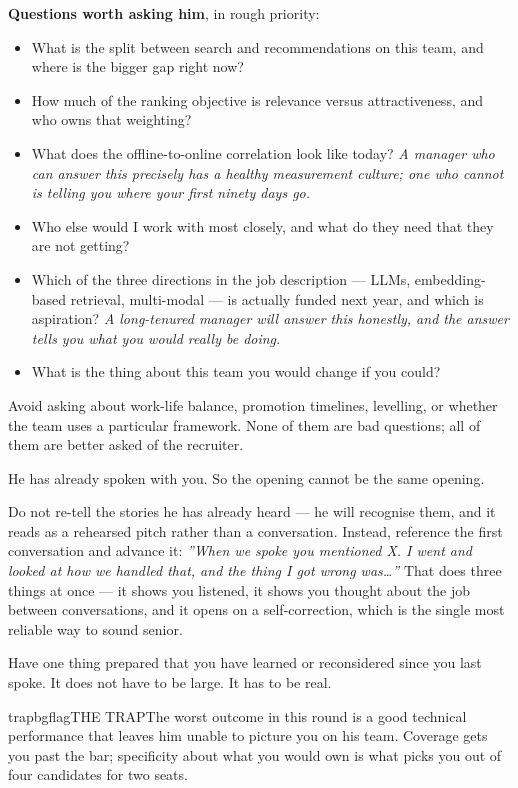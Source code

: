 \documentclass[10pt,twoside]{book}
\makeatletter
\newcommand{\csection}[1]{\par\vspace{13pt}\noindent{\sffamily\large\bfseries\color{ink}\raggedright #1\par}\vspace{4pt}}
\newenvironment{callouttrap}{\begin{co@box}{trapbg}{flag}{THE TRAP}}{\end{co@box}}
\makeatother
\begin{document}
\textbf{Questions worth asking him}, in rough priority:\par
\begin{itemize}
\item What is the split between search and recommendations on this team, and where is the bigger gap right now?
\item How much of the ranking objective is relevance versus attractiveness, and who owns that weighting?
\item What does the offline-to-online correlation look like today? \textit{A manager who can answer this precisely has a healthy measurement culture; one who cannot is telling you where your first ninety days go.}
\item Who else would I work with most closely, and what do they need that they are not getting?
\item Which of the three directions in the job description --- LLMs, embedding-based retrieval, multi-modal --- is actually funded next year, and which is aspiration? \textit{A long-tenured manager will answer this honestly, and the answer tells you what you would really be doing.}
\item What is the thing about this team you would change if you could?
\end{itemize}
Avoid asking about work-life balance, promotion timelines, levelling, or whether the team uses a particular framework. None of them are bad questions; all of them are better asked of the recruiter.\par
\csection{The second-conversation problem}
He has already spoken with you. So the opening cannot be the same opening.\par
Do not re-tell the stories he has already heard --- he will recognise them, and it reads as a rehearsed pitch rather than a conversation. Instead, reference the first conversation and advance it: \textit{''When we spoke you mentioned X. I went and looked at how we handled that, and the thing I got wrong was\ldots{}''} That does three things at once --- it shows you listened, it shows you thought about the job between conversations, and it opens on a self-correction, which is the single most reliable way to sound senior.\par
Have one thing prepared that you have learned or reconsidered since you last spoke. It does not have to be large. It has to be real.\par
\begin{callouttrap}The worst outcome in this round is a good technical performance that leaves him unable to picture you on his team. Coverage gets you past the bar; specificity about what you would own is what picks you out of four candidates for two seats.\end{callouttrap}
\end{document}
